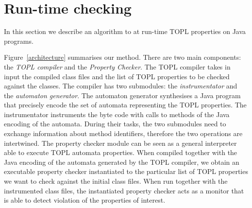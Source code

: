 \documentclass[10pt]{llncs} %
\begin{document}
\section{Run-time checking}
In this section we describe an algorithm to at run-time TOPL properties on Java programs.

Figure~\ref{architecture} summarises our method. There are two main components: the {\em TOPL compiler} and the {\em Property Checker}.  
The TOPL compiler takes in input the compiled class files and the list of TOPL properties to be checked against the classes. The compiler has two submodules: the {\em instrumentator} and the {\em automaton generator}.
The automaton generator synthesises a Java program that precisely encode the set of automata representing the TOPL properties. The instrumentator instruments the byte code with calls to methods of the Java encoding of the automata.
During their tasks, the two submodules need to exchange information about method identifiers, therefore the two operations are intertwined.   
The property checker module can be seen as a general interpreter able to execute TOPL automata properties. When compiled together with the Java encoding of the automata generated by the TOPL compiler, we obtain an executable property checker instantiated to the particular list of TOPL properties we want to check against the initial class files.
When run together with the instrumented class files, the instantiated property checker acts as a monitor that is able to detect violation of the properties of interest.
\end{document}

